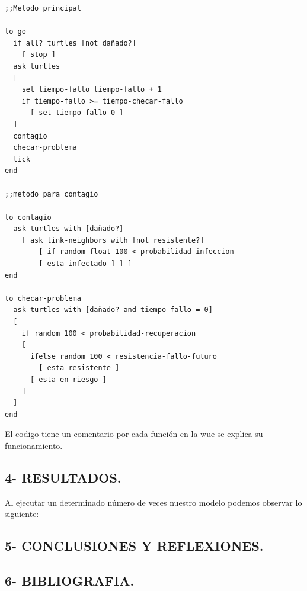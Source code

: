 \documentclass[12pt]{article}
\begin{document}
\begin{verbatim}
;;Metodo principal

to go
  if all? turtles [not dañado?]
    [ stop ]
  ask turtles
  [
    set tiempo-fallo tiempo-fallo + 1
    if tiempo-fallo >= tiempo-checar-fallo
      [ set tiempo-fallo 0 ]
  ]
  contagio
  checar-problema
  tick
end

;;metodo para contagio

to contagio
  ask turtles with [dañado?]
    [ ask link-neighbors with [not resistente?]
        [ if random-float 100 < probabilidad-infeccion
        [ esta-infectado ] ] ]
end

to checar-problema
  ask turtles with [dañado? and tiempo-fallo = 0]
  [
    if random 100 < probabilidad-recuperacion
    [
      ifelse random 100 < resistencia-fallo-futuro
        [ esta-resistente ]
      [ esta-en-riesgo ]
    ]
  ]
end
\end{verbatim}

El codigo tiene un comentario por cada función en la wue se explica su funcionamiento.


{\color{blue} \subsection*{4- RESULTADOS.}}
\vspace{1em}

Al ejecutar un determinado número de veces nuestro modelo podemos observar lo siguiente:\\


{\color{blue} \subsection*{5- CONCLUSIONES Y REFLEXIONES.}}
\vspace{1em}

{\color{blue} \subsection*{6- BIBLIOGRAFIA.}}
\vspace{1em}
\end{document}
